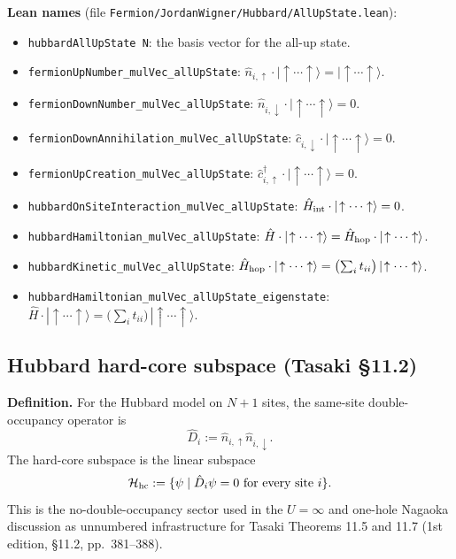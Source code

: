 \documentclass[a4paper,11pt]{article}
\begin{document}
\noindent\textbf{Lean names}
(file \texttt{Fermion/JordanWigner/Hubbard/AllUpState.lean}):
\begin{itemize}
  \item \texttt{hubbardAllUpState N}: the basis vector for the all-up state.
  \item \texttt{fermionUpNumber\_mulVec\_allUpState}:
    $\hat n_{i,\uparrow}\cdot|\!\uparrow\cdots\uparrow\rangle = |\!\uparrow\cdots\uparrow\rangle$.
  \item \texttt{fermionDownNumber\_mulVec\_allUpState}:
    $\hat n_{i,\downarrow}\cdot|\!\uparrow\cdots\uparrow\rangle = 0$.
  \item \texttt{fermionDownAnnihilation\_mulVec\_allUpState}:
    $\hat c_{i,\downarrow}\cdot|\!\uparrow\cdots\uparrow\rangle = 0$.
  \item \texttt{fermionUpCreation\_mulVec\_allUpState}:
    $\hat c^\dagger_{i,\uparrow}\cdot|\!\uparrow\cdots\uparrow\rangle = 0$.
  \item \texttt{hubbardOnSiteInteraction\_mulVec\_allUpState}:
    $\hat H_{\rm int}\cdot|\!\uparrow\cdots\uparrow\rangle = 0$.
  \item \texttt{hubbardHamiltonian\_mulVec\_allUpState}:
    $\hat H\cdot|\!\uparrow\cdots\uparrow\rangle
      = \hat H_{\rm hop}\cdot|\!\uparrow\cdots\uparrow\rangle$.
  \item \texttt{hubbardKinetic\_mulVec\_allUpState}:
    $\hat H_{\rm hop}\cdot|\!\uparrow\cdots\uparrow\rangle
      = \bigl(\sum_i t_{ii}\bigr)\,|\!\uparrow\cdots\uparrow\rangle$.
  \item \texttt{hubbardHamiltonian\_mulVec\_allUpState\_eigenstate}:
    $\hat H\cdot|\!\uparrow\cdots\uparrow\rangle
      = \bigl(\sum_i t_{ii}\bigr)\,|\!\uparrow\cdots\uparrow\rangle$.
\end{itemize}

\subsection{Hubbard hard-core subspace (Tasaki §11.2)}
\label{subsec:hubbard-hardcore-subspace}

\noindent\textbf{Definition.}
For the Hubbard model on \(N+1\) sites, the same-site
double-occupancy operator is
\[
  \hat D_i := \hat n_{i,\uparrow}\hat n_{i,\downarrow}.
\]
The hard-core subspace is the linear subspace
\[
  \mathcal H_{\rm hc}
  :=
  \{\psi \mid \hat D_i\psi = 0 \text{ for every site } i\}.
\]
This is the no-double-occupancy sector used in the \(U=\infty\)
and one-hole Nagaoka discussion as unnumbered infrastructure for
Tasaki Theorems 11.5 and 11.7 (1st edition, §11.2, pp.~381--388).
\end{document}
